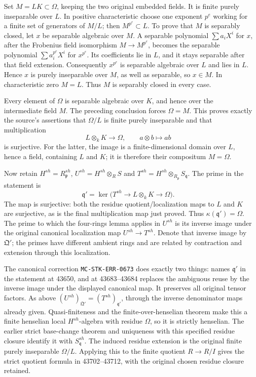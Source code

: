 Set \(M=LK\subset\Omega\), keeping the two original embedded fields. It is finite purely inseparable over \(L\). In positive characteristic choose one exponent \(p^e\) working for a finite set of generators of \(M/L\); then \(M^{p^e}\subset L\). To prove that \(M\) is separably closed, let \(x\) be separable algebraic over \(M\). A separable polynomial \(\sum a_iX^i\) for \(x\), after the Frobenius field isomorphism \(M\to M^{p^e}\), becomes the separable polynomial \(\sum a_i^{p^e}X^i\) for \(x^{p^e}\). Its coefficients lie in \(L\), and it stays separable after that field extension. Consequently \(x^{p^e}\) is separable algebraic over \(L\) and lies in \(L\). Hence \(x\) is purely inseparable over \(M\), as well as separable, so \(x\in M\). In characteristic zero \(M=L\). Thus \(M\) is separably closed in every case.

Every element of \(\Omega\) is separable algebraic over \(K\), and hence over the intermediate field \(M\). The preceding conclusion forces \(\Omega=M\). This proves exactly the source's assertions that \(\Omega/L\) is finite purely inseparable and that multiplication \[
 L\otimes_k K\longrightarrow\Omega,\qquad a\otimes b\longmapsto ab
\] is surjective. For the latter, the image is a finite-dimensional domain over \(L\), hence a field, containing \(L\) and \(K\); it is therefore their compositum \(M=\Omega\).

Now retain \(H^{sh}=R_{\mathfrak p}^{sh}\), \(U^{sh}=H^{sh}\otimes_R S\) and \(T^{sh}=H^{sh}\otimes_{R_{\mathfrak p}}S_{\mathfrak q}\). The prime in the statement is \[
 \mathfrak q'=\ker\bigl(T^{sh}\longrightarrow L\otimes_k K
                                     \longrightarrow\Omega\bigr).
\] The map is surjective: both the residue quotient/localization maps to \(L\) and \(K\) are surjective, as is the final multiplication map just proved. Thus \(\kappa(\mathfrak q')=\Omega\). The prime to which the four-rings lemma applies in \(U^{sh}\) is its inverse image under the original canonical localization map \(U^{sh}\to T^{sh}\). Denote that inverse image by \(\mathfrak Q'\); the primes have different ambient rings and are related by contraction and extension through this localization.

The canonical correction \texttt{MC-STK-ERR-0673} does exactly two things: names \(\mathfrak q'\) in the statement at 43650, and at 43683--43684 replaces the ambiguous reuse by the inverse image under the displayed canonical map. It preserves all original tensor factors. As above \((U^{sh})_{\mathfrak Q'}=(T^{sh})_{\mathfrak q'}\), through the inverse denominator maps already given. Quasi-finiteness and the finite-over-henselian theorem make this a finite henselian local \(H^{sh}\)-algebra with residue \(\Omega\), so it is strictly henselian. The earlier strict base-change theorem and uniqueness with this specified residue closure identify it with \(S_{\mathfrak q}^{sh}\). The induced residue extension is the original finite purely inseparable \(\Omega/L\). Applying this to the finite quotient \(R\to R/I\) gives the strict quotient formula in 43702--43712, with the original chosen residue closure retained.

